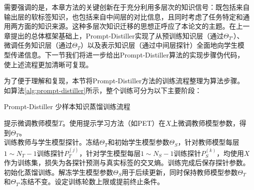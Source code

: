 \documentclass[../main.tex]{subfiles}
\begin{document}
需要强调的是，本章方法的关键创新在于充分利用多层次的知识信号：既包括来自输出层的软标签知识，也包括来自中间层的对比信息，且同时考虑了任务特定和通用两方面的知识来源。这种多层次知识迁移的思想正呼应了本论文的主题。在上一章提出的总体框架基础上，Prompt-Distiller实现了从预训练知识层（通过$\Theta_{T'}$）、微调任务知识层（通过$\Theta_T$）以及表示知识层（通过中间层探针）全面地向学生模型传递信息。下一节我们将进一步给出Prompt-Distiller算法的实现步骤伪代码，使上述流程更加清晰可复现。

\label{sec:ch3-4-prompt-distiller-implementation}
为了便于理解和复现，本节将Prompt-Distiller方法的训练流程整理为算法步骤。如算法\ref{alg:prompt-distiller}所示，整个训练可分为以下主要阶段：

\begin{algorithm}[t]
	\small
	\caption{Prompt-Distiller 少样本知识蒸馏训练流程}
	\label{alg:prompt-distiller}
	\BlankLine
	提示微调教师模型$T$。使用提示学习方法（如PET）在$X$上微调教师模型参数，得到$\Theta_T$。\\[0.5ex]
	训练教师与学生模型探针。冻结$\Theta_T$和初始学生模型参数$\Theta_S$，针对教师模型每层$1\sim N_T-1$训练探针$P_T^{(j)}$，针对学生模型每层$1\sim N_S-1$训练探针$P_S^{(k)}$，均使用$X$作为训练集，损失为各探针预测与真实标签的交叉熵。训练完成后保存探针参数。\\[0.5ex]
	初始化蒸馏训练。解冻学生模型参数$\Theta_S$用于后续更新，同时保持教师模型参数$\Theta_T$和$\Theta_{T'}$冻结不变。设定训练轮数上限或提前终止条件。\\[0.5ex]
\end{algorithm}
\end{document}
